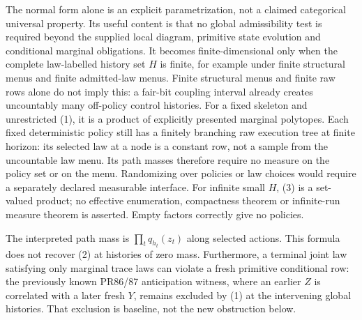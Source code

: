 \documentclass[11pt]{article}
\begin{document}
The normal form alone is an explicit parametrization, not a claimed categorical universal property. Its useful content is that no global admissibility test is required beyond the supplied local diagram, primitive state evolution and conditional marginal obligations. It becomes finite-dimensional only when the complete law-labelled history set $H$ is finite, for example under finite structural menus and finite admitted-law menus. Finite structural menus and finite raw rows alone do not imply this: a fair-bit coupling interval already creates uncountably many off-policy control histories. For a fixed skeleton and unrestricted (1), it is a product of explicitly presented marginal polytopes. Each fixed deterministic policy still has a finitely branching raw execution tree at finite horizon: its selected law at a node is a constant row, not a sample from the uncountable law menu. Its path masses therefore require no measure on the policy set or on the menu. Randomizing over policies or law choices would require a separately declared measurable interface. For infinite small $H$, (3) is a set-valued product; no effective enumeration, compactness theorem or infinite-run measure theorem is asserted. Empty factors correctly give no policies.

The interpreted path mass is $\prod_tq_{h_t}(z_t)$ along selected actions. This formula does not recover (2) at histories of zero mass. Furthermore, a terminal joint law satisfying only marginal trace laws can violate a fresh primitive conditional row: the previously known PR86/87 anticipation witness, where an earlier $Z$ is correlated with a later fresh $Y$, remains excluded by (1) at the intervening global histories. That exclusion is baseline, not the new obstruction below.
\end{document}
